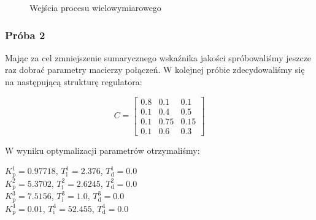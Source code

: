 \begin{figure}
    \begin{subfigure}[b]{\textwidth}
        \centering
    \end{subfigure}

    \caption{Wejścia procesu wielowymiarowego}
    \label{pro_pid_konf3_in1}
\end{figure}
\FloatBarrier

\subsubsection{Próba 2}

Mając za cel zmniejszenie sumarycznego wskaźnika jakości spróbowaliśmy jeszcze raz
dobrać parametry macierzy połączeń. W kolejnej próbie zdecydowaliśmy się na następującą
strukturę regulatora:

\[
C =
\begin{bmatrix}
    0.8 & 0.1 & 0.1 \\
    0.1 & 0.4 & 0.5 \\
    0.1 & 0.75 & 0.15 \\
    0.1 & 0.6 & 0.3 
\end{bmatrix}
\]

W wyniku optymalizacji parametrów otrzymaliśmy:

\begin{center}
    $K^{\num{1}}_{\mathrm{p}} = \num{0.97718}$, $T^{\num{1}}_{\mathrm{i}} = \num{2.376}$, $T^{\num{1}}_{\mathrm{d}} = \num{0.0}$ \\
    $K^{\num{2}}_{\mathrm{p}} = \num{5.3702}$, $T^{\num{2}}_{\mathrm{i}} = \num{2.6245}$, $T^{\num{2}}_{\mathrm{d}} = \num{0.0}$ \\
    $K^{\num{3}}_{\mathrm{p}} = \num{7.5156}$, $T^{\num{3}}_{\mathrm{i}} = \num{1.0}$, $T^{\num{3}}_{\mathrm{d}} = \num{0.0}$ \\
    $K^{\num{4}}_{\mathrm{p}} = \num{0.01}$, $T^{\num{4}}_{\mathrm{i}} = \num{52.455}$, $T^{\num{4}}_{\mathrm{d}} = \num{0.0}$ \\
\end{center}

